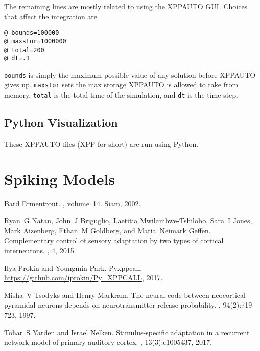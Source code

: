 \documentclass[a4paper,10pt]{article}
\newcommand{\y}[1]{{\texttt{#1}}}
\begin{document}
The remaining lines are mostly related to using the XPPAUTO GUI. Choices that affect the integration are
\begin{verbatim}
@ bounds=100000
@ maxstor=1000000
@ total=200
@ dt=.1
\end{verbatim}
\y{bounds} is simply the maximum possible value of any solution before XPPAUTO gives up. \y{maxstor} sets the max storage XPPAUTO is allowed to take from memory. \y{total} is the total time of the simulation, and \y{dt} is the time step.

\subsection{Python Visualization}
These XPPAUTO files (XPP for short) are run using Python. 


\section{Spiking Models}

\begin{thebibliography}{1}

Bard Ermentrout.
, volume~14.
\newblock Siam, 2002.

Ryan~G Natan, John~J Briguglio, Laetitia Mwilambwe-Tshilobo, Sara~I Jones, Mark
  Aizenberg, Ethan~M Goldberg, and Maria~Neimark Geffen.
\newblock Complementary control of sensory adaptation by two types of cortical
  interneurons.
, 4, 2015.

Ilya Prokin and Youngmin Park.
\newblock Pyxppcall.
\newblock \url{https://github.com/iprokin/Py_XPPCALL}, 2017.

Misha~V Tsodyks and Henry Markram.
\newblock The neural code between neocortical pyramidal neurons depends on
  neurotransmitter release probability.
,
  94(2):719--723, 1997.

Tohar~S Yarden and Israel Nelken.
\newblock Stimulus-specific adaptation in a recurrent network model of primary
  auditory cortex.
, 13(3):e1005437, 2017.

\end{thebibliography}
\end{document}
